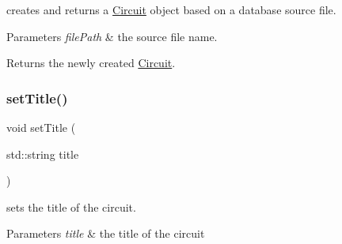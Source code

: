 creates and returns a \mbox{\hyperlink{class_s_p_i_c_e_1_1_circuit}{Circuit}} object based on a database source file. 


\begin{DoxyParams}{Parameters}
{\em file\+Path} & the source file name.\\
\hline
\end{DoxyParams}
\begin{DoxyReturn}{Returns}
the newly created \mbox{\hyperlink{class_s_p_i_c_e_1_1_circuit}{Circuit}}. 
\end{DoxyReturn}
\mbox{\label{class_s_p_i_c_e_1_1_circuit_a798df9ebd558e22c85eeceb5202e3123}} 
\subsubsection{\texorpdfstring{set\+Title()}{setTitle()}}
{\footnotesize\ttfamily void set\+Title (\begin{DoxyParamCaption}\item[{std\+::string}]{title }\end{DoxyParamCaption})\hspace{0.3cm}{\ttfamily [inline]}}



sets the title of the circuit. 


\begin{DoxyParams}{Parameters}
{\em title} & the title of the circuit \\
\hline
\end{DoxyParams}
